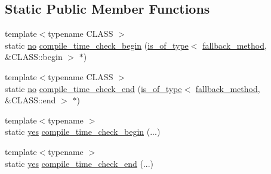 \subsection*{Static Public Member Functions}
\begin{DoxyCompactItemize}
\item 
{\footnotesize template$<$typename C\+L\+A\+SS $>$ }\\static \mbox{\hyperlink{namespacesnowhouse_1_1typing_ad9bd8c4cca2c9f7de1faf7a7f53b1bda}{no}} \mbox{\hyperlink{structsnowhouse_1_1typing_1_1is__container_a99f830a0dd21b6c44c1949df6a870529}{compile\+\_\+time\+\_\+check\+\_\+begin}} (\mbox{\hyperlink{structsnowhouse_1_1typing_1_1is__container_1_1is__of__type}{is\+\_\+of\+\_\+type}}$<$ \mbox{\hyperlink{structsnowhouse_1_1typing_1_1is__container_a483fd82ca18826d91df5ecf9b0635f19}{fallback\+\_\+method}}, \&C\+L\+A\+S\+S\+::begin $>$ $\ast$)
\item 
{\footnotesize template$<$typename C\+L\+A\+SS $>$ }\\static \mbox{\hyperlink{namespacesnowhouse_1_1typing_ad9bd8c4cca2c9f7de1faf7a7f53b1bda}{no}} \mbox{\hyperlink{structsnowhouse_1_1typing_1_1is__container_a32ebf1d5da5ac8a86c2048b2e00816ff}{compile\+\_\+time\+\_\+check\+\_\+end}} (\mbox{\hyperlink{structsnowhouse_1_1typing_1_1is__container_1_1is__of__type}{is\+\_\+of\+\_\+type}}$<$ \mbox{\hyperlink{structsnowhouse_1_1typing_1_1is__container_a483fd82ca18826d91df5ecf9b0635f19}{fallback\+\_\+method}}, \&C\+L\+A\+S\+S\+::end $>$ $\ast$)
\item 
{\footnotesize template$<$typename $>$ }\\static \mbox{\hyperlink{namespacesnowhouse_1_1typing_a4b319cb7567ee3475023c05ed2dadb16}{yes}} \mbox{\hyperlink{structsnowhouse_1_1typing_1_1is__container_a4345787e585860226643cb6cd14670e3}{compile\+\_\+time\+\_\+check\+\_\+begin}} (...)
\item 
{\footnotesize template$<$typename $>$ }\\static \mbox{\hyperlink{namespacesnowhouse_1_1typing_a4b319cb7567ee3475023c05ed2dadb16}{yes}} \mbox{\hyperlink{structsnowhouse_1_1typing_1_1is__container_a3cdf728c23a2fae68fed6dae11363f14}{compile\+\_\+time\+\_\+check\+\_\+end}} (...)
\end{DoxyCompactItemize}
